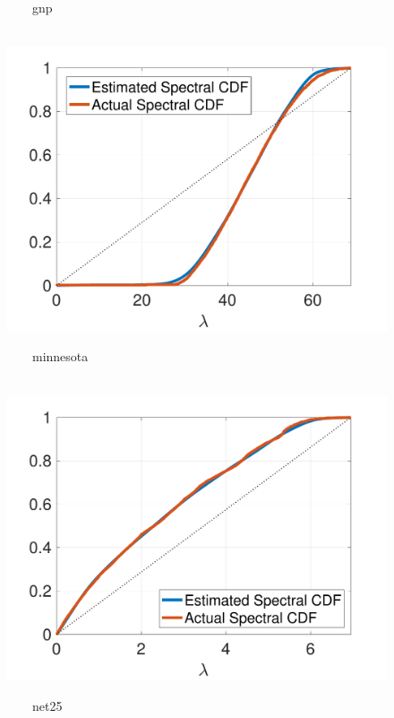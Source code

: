 \documentclass{article}
\begin{document}
\begin{figure}[bt] 
\begin{minipage}[m]{0.32\linewidth}
\centerline{\small{~~~~gnp}}
\centerline{~~\includegraphics[width=1.1\linewidth]{fig_gnp_cdf2}}
\end{minipage}
\begin{minipage}[m]{0.32\linewidth}
\centerline{\small{~~~~minnesota}}
\centerline{~~\includegraphics[width=1.1\linewidth]{fig_minnesota_cdf}}
\end{minipage}
\begin{minipage}[m]{0.32\linewidth}
\centerline{\small{~~~~net25}}

\end{minipage}
\end{figure}
\end{document}
